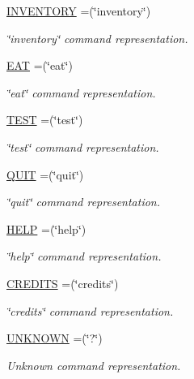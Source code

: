 \begin{DoxyCompactItemize}
\hyperlink{enumpkg__parsing_1_1CommandWord_a3dace936c35682fe74dad6714af270e4}{I\-N\-V\-E\-N\-T\-O\-R\-Y} =(\char`\"{}inventory\char`\"{})
\begin{DoxyCompactList}\small\item\em \char`\"{}inventory\char`\"{} command representation. \end{DoxyCompactList}\item 
\hyperlink{enumpkg__parsing_1_1CommandWord_a4fe488aea9cdd9ed9455682d42a300b3}{E\-A\-T} =(\char`\"{}eat\char`\"{})
\begin{DoxyCompactList}\small\item\em \char`\"{}eat\char`\"{} command representation. \end{DoxyCompactList}\item 
\hyperlink{enumpkg__parsing_1_1CommandWord_acf61cb32b4d651f87b2cd342761f9a79}{T\-E\-S\-T} =(\char`\"{}test\char`\"{})
\begin{DoxyCompactList}\small\item\em \char`\"{}test\char`\"{} command representation. \end{DoxyCompactList}\item 
\hyperlink{enumpkg__parsing_1_1CommandWord_a2f645cd1791d5576f42e1fe14d202c17}{Q\-U\-I\-T} =(\char`\"{}quit\char`\"{})
\begin{DoxyCompactList}\small\item\em \char`\"{}quit\char`\"{} command representation. \end{DoxyCompactList}\item 
\hyperlink{enumpkg__parsing_1_1CommandWord_ace035a3a624f4247b9f38c24eabe3f91}{H\-E\-L\-P} =(\char`\"{}help\char`\"{})
\begin{DoxyCompactList}\small\item\em \char`\"{}help\char`\"{} command representation. \end{DoxyCompactList}\item 
\hyperlink{enumpkg__parsing_1_1CommandWord_a4267a564de4d81cec28764b1eeb3ce22}{C\-R\-E\-D\-I\-T\-S} =(\char`\"{}credits\char`\"{})
\begin{DoxyCompactList}\small\item\em \char`\"{}credits\char`\"{} command representation. \end{DoxyCompactList}\item 
\hyperlink{enumpkg__parsing_1_1CommandWord_a7a089aad12d2934da530b785a3daab49}{U\-N\-K\-N\-O\-W\-N} =(\char`\"{}?\char`\"{})
\begin{DoxyCompactList}\small\item\em Unknown command representation. \end{DoxyCompactList}\end{DoxyCompactItemize}


